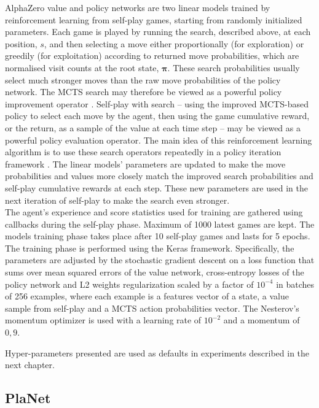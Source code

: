 AlphaZero value and policy networks are two linear models trained by reinforcement learning from self-play games, starting from randomly initialized parameters. Each game is played by running the search, described above, at each position, $s$, and then selecting a move either proportionally (for exploration) or greedily (for exploitation) according to returned move probabilities, which are normalised visit counts at the root state, $\boldsymbol\pi$. These search probabilities usually select much stronger moves than the raw move probabilities of the policy network. The MCTS search may therefore be viewed as a powerful policy improvement operator \cite{Book.RLAI}. Self-play with search – using the improved MCTS-based policy to select each move by the agent, then using the game cumulative reward, or the return, as a sample of the value at each time step – may be viewed as a powerful policy evaluation operator. The main idea of this reinforcement learning algorithm is to use these search operators repeatedly in a policy iteration framework \cite{Algo.AlphaGoZero}. The linear models' parameters are updated to make the move probabilities and values more closely match the improved search probabilities and self-play cumulative rewards at each step. These new parameters are used in the next iteration of self-play to make the search even stronger. \\
The agent's experience and score statistics used for training are gathered using callbacks during the self-play phase. Maximum of 1000 latest games are kept. The models training phase takes place after 10 self-play games and lasts for 5 epochs. The training phase is performed using the Keras \cite{Code.Keras} framework. Specifically, the parameters are adjusted by the stochastic gradient descent on a loss function that sums over mean squared errors of the value network, cross-entropy losses of the policy network and L2 weights regularization scaled by a factor of $10^{-4}$ in batches of 256 examples, where each example is a features vector of a state, a value sample from self-play and a MCTS action probabilities vector. The Nesterov's momentum optimizer \cite{Algo.Nesterov} is used with a learning rate of $10^{-2}$ and a momentum of $0,9$.

Hyper-parameters presented are used as defaults in experiments described in the next chapter.

\subsection{PlaNet}

